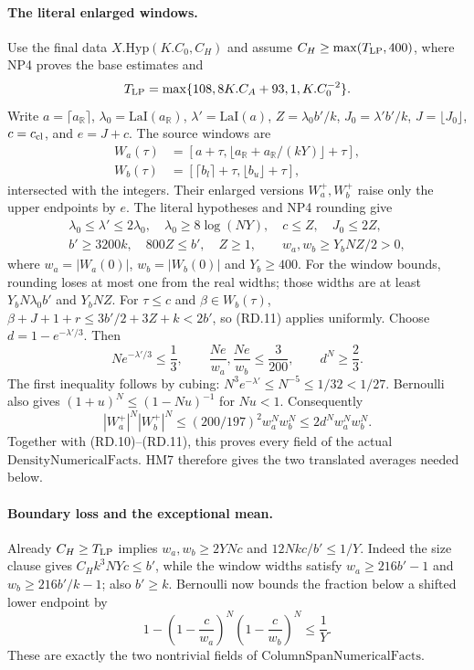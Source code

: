 \paragraph{The literal enlarged windows.}
Use the final data $X.\mathrm{Hyp}(K.C_0,C_H)$ and assume
$C_H\ge\max(T_{\rm LP},400)$, where NP4 proves the base estimates and
\[
 T_{\rm LP}=\max\{108,8K.C_A+93,1,K.C_0^{-2}\}.
\]
Write $a=\lceil a_{\mathbb R}\rceil$,
$\lambda_0=\mathrm{LaI}(a_{\mathbb R})$,
$\lambda' =\mathrm{LaI}(a)$, $Z=\lambda_0b'/k$,
$J_0=\lambda'b'/k$, $J=\lfloor J_0\rfloor$, $c=c_{\rm cl}$,
and $e=J+c$. The source windows are
\[
\begin{aligned}
 W_a(\tau)&=[a+\tau,\lfloor a_{\mathbb R}+a_{\mathbb R}/(kY)\rfloor+\tau],\\
 W_b(\tau)&=[\lceil b_l\rceil+\tau,\lfloor b_u\rfloor+\tau],
\end{aligned}
\]
intersected with the integers. Their enlarged versions $W_a^+,W_b^+$
raise only the upper endpoints by $e$.
The literal hypotheses and NP4 rounding give
\[
\begin{gathered}
 \lambda_0\le\lambda'\le2\lambda_0,\quad
 \lambda_0\ge8\log(NY),\quad c\le Z,\quad J_0\le2Z,\\
 b'\ge3200k,\quad800Z\le b',\quad Z\ge1,\qquad
 w_a,w_b\ge Y_bNZ/2>0,
\end{gathered}
\]
where $w_a=|W_a(0)|$, $w_b=|W_b(0)|$ and $Y_b\ge400$.
For the window bounds, rounding loses at most one from the real widths;
those widths are at least $Y_bN\lambda_0b'$ and $Y_bNZ$.
For $\tau\le c$ and $\beta\in W_b(\tau)$,
$\beta+J+1+r\le3b'/2+3Z+k<2b'$, so (RD.11) applies uniformly.
Choose $d=1-e^{-\lambda'/3}$. Then
\[
 Ne^{-\lambda'/3}\le\frac13,
 \qquad \frac{Ne}{w_a},\frac{Ne}{w_b}\le\frac3{200},
 \qquad d^N\ge\frac23.
\]
The first inequality follows by cubing:
$N^3e^{-\lambda'}\le N^{-5}\le1/32<1/27$.
Bernoulli also gives
$ (1+u)^N\le(1-Nu)^{-1}$ for $Nu<1$.
Consequently
\[
 |W_a^+|^N|W_b^+|^N
 \le(200/197)^2w_a^Nw_b^N
 \le2d^Nw_a^Nw_b^N.
 \tag{RD.12}
\]
Together with (RD.10)--(RD.11), this proves every field of the actual
$\mathrm{DensityNumericalFacts}$. HM7 therefore gives the two translated
averages needed below.

\paragraph{Boundary loss and the exceptional mean.}
Already $C_H\ge T_{\rm LP}$ implies
$w_a,w_b\ge2YNc$ and $12Nkc/b'\le1/Y$.
Indeed the size clause gives $C_Hk^3NYc\le b'$,
while the window widths satisfy
$w_a\ge216b'-1$ and $w_b\ge216b'/k-1$; also $b'\ge k$.
Bernoulli now bounds the fraction below a shifted lower endpoint by
\[
 1-\left(1-\frac c{w_a}\right)^N
       \left(1-\frac c{w_b}\right)^N\le\frac1Y.
 \tag{RD.13}
\]
These are exactly the two nontrivial fields of
$\mathrm{ColumnSpanNumericalFacts}$.

